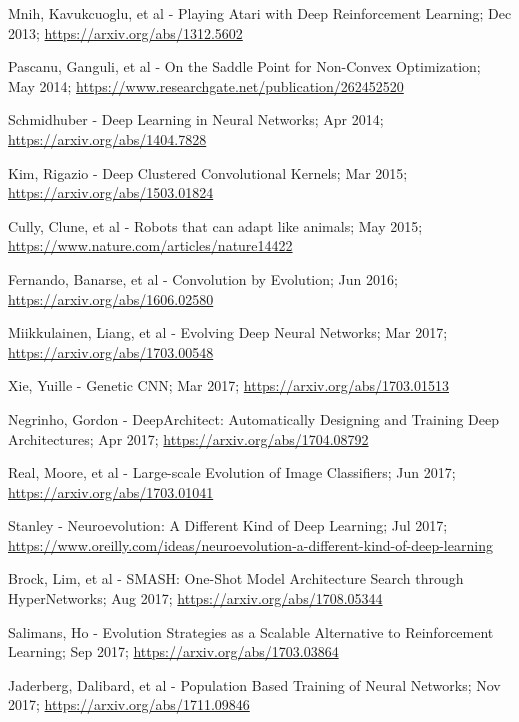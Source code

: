 \documentclass[journal, a4paper]{IEEEtran}
\begin{document}
\begin{thebibliography}{5}
    Mnih, Kavukcuoglu, et al - Playing Atari with Deep Reinforcement Learning; Dec 2013;
    \url{https://arxiv.org/abs/1312.5602}

    Pascanu, Ganguli, et al - On the Saddle Point for Non-Convex Optimization; May 2014;
    \url{https://www.researchgate.net/publication/262452520}

    Schmidhuber - Deep Learning in Neural Networks; Apr 2014;
    \url{https://arxiv.org/abs/1404.7828}

    Kim, Rigazio - Deep Clustered Convolutional Kernels; Mar 2015;
    \url{https://arxiv.org/abs/1503.01824}

    Cully, Clune, et al - Robots that can adapt like animals; May 2015;
    \url{https://www.nature.com/articles/nature14422}

    Fernando, Banarse, et al - Convolution by Evolution; Jun 2016;
    \url{https://arxiv.org/abs/1606.02580}

    Miikkulainen, Liang, et al - Evolving Deep Neural Networks; Mar 2017;
    \url{https://arxiv.org/abs/1703.00548}

    Xie, Yuille - Genetic CNN; Mar 2017;
    \url{https://arxiv.org/abs/1703.01513}

    Negrinho, Gordon - DeepArchitect: Automatically Designing and Training Deep Architectures; Apr 2017;
    \url{https://arxiv.org/abs/1704.08792}

    Real, Moore, et al - Large-scale Evolution of Image Classifiers; Jun 2017;
    \url{https://arxiv.org/abs/1703.01041}

    Stanley - Neuroevolution: A Different Kind of Deep Learning; Jul 2017;
    \url{https://www.oreilly.com/ideas/neuroevolution-a-different-kind-of-deep-learning}

    Brock, Lim, et al - SMASH: One-Shot Model Architecture Search through HyperNetworks; Aug 2017;
    \url{https://arxiv.org/abs/1708.05344}

    Salimans, Ho - Evolution Strategies as a Scalable Alternative to Reinforcement Learning; Sep 2017;
    \url{https://arxiv.org/abs/1703.03864}

    Jaderberg, Dalibard, et al - Population Based Training of Neural Networks; Nov 2017;
    \url{https://arxiv.org/abs/1711.09846}


\end{thebibliography}
\end{document}
